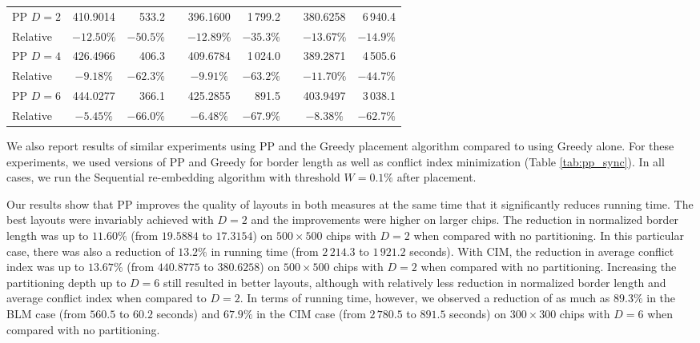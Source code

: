 \begin{table}[t!]
{\begin{tabular}{lcrlcrlcr}
\hline
PP $D=2$ & 410.9014 &    533.2   & & 396.1600 & 1\,799.2   & & 380.6258 & 6\,940.4   \\
Relative &$-12.50\%$&   $-50.5\%$& &$-12.89\%$&   $-35.3\%$& &$-13.67\%$&   $-14.9\%$\\
\hline
PP $D=4$ & 426.4966 &    406.3   & & 409.6784 & 1\,024.0   & & 389.2871 & 4\,505.6   \\
Relative & $-9.18\%$&   $-62.3\%$& & $-9.91\%$&   $-63.2\%$& &$-11.70\%$&   $-44.7\%$\\
\hline
PP $D=6$ & 444.0277 &    366.1   & & 425.2855 &    891.5   & & 403.9497 & 3\,038.1   \\
Relative & $-5.45\%$&   $-66.0\%$& & $-6.48\%$&   $-67.9\%$& & $-8.38\%$&   $-62.7\%$\\
\hline
\end{tabular}}
\end{table}

We also report results of similar experiments using PP and the Greedy placement
algorithm compared to using Greedy alone. For these experiments, we used
versions of PP and Greedy for border length as well as conflict index
minimization (Table \ref{tab:pp_sync}). In all cases, we run the Sequential
re-embedding algorithm with threshold $W=0.1\%$ after placement.

Our results show that PP improves the quality of layouts in both measures at the
same time that it significantly reduces running time. The best layouts were
invariably achieved with $D=2$ and the improvements were higher on larger chips.
The reduction in normalized border length was up to $11.60\%$ (from $19.5884$ to
$17.3154$) on $500\times 500$ chips with $D=2$ when compared with no
partitioning. In this particular case, there was also a reduction of $13.2\%$ in
running time (from $2\,214.3$ to $1\,921.2$ seconds). With CIM, the reduction in
average conflict index was up to $13.67\%$ (from $440.8775$ to $380.6258$) on
$500\times 500$ chips with $D=2$ when compared with no partitioning. Increasing
the partitioning depth up to $D=6$ still resulted in better layouts, although
with relatively less reduction in normalized border length and average conflict
index when compared to $D=2$. In terms of running time, however, we observed a
reduction of as much as $89.3\%$ in the BLM case (from $560.5$ to $60.2$
seconds) and $67.9\%$ in the CIM case (from $2\,780.5$ to $891.5$ seconds) on
$300\times 300$ chips with $D=6$ when compared with no partitioning.

